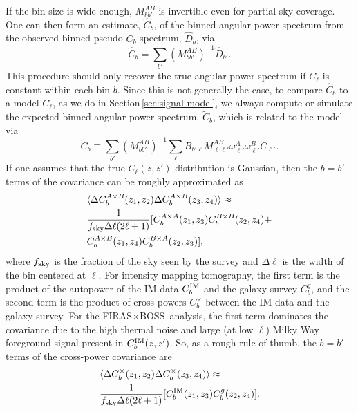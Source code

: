 \documentclass[fleqn,usenatbib]{mnras}
\newcommand{\FB}{FIRAS${\times}$BOSS}
\begin{document}
If the bin size is wide enough, $M^{AB}_{b b'}$ is invertible even for partial sky coverage. One can then form an estimate, $\hat{C}_b$, of the binned angular power spectrum from the observed binned pseudo-$C_{b}$ spectrum, $\hat{D}_b$, via
\begin{equation}\label{eq:binned_mixing}
\hat{C}_b = \sum_{b'} \left( M^{AB}_{b b'}\right)^{-1} \hat{D}_{b'}.
\end{equation}
This procedure should only recover the true angular power spectrum if $C_{\ell}$ is constant within each bin $b$. Since this is not generally the case, to compare $\hat{C}_{b}$ to a model $C_{\ell}$, as we do in Section\,\ref{sec:signal model}, we always compute or simulate the expected binned angular power spectrum, $\tilde{C}_b$, which is related to the model via
\begin{equation}\label{eq:model_mixing_binning}
\tilde{C}_b \equiv \sum_{b'} \left(M^{AB}_{b b'}\right)^{-1} \sum_{\ell} B_{b' \ell} M^{AB}_{\ell \ell'} \omega^A_{\ell'}\omega^B_{\ell'} C_{\ell'}.
\end{equation}
If one assumes that the true $C_{\ell}(z,z')$ distribution is Gaussian, then the $b = b'$ terms of the covariance can be roughly approximated as
\begin{equation}
\begin{split}\label{eq:general_gaussian_variance}
    &\langle \Delta C_b^{A\times B}(z_1,z_2) \Delta C_b^{A\times B}(z_3,z_4) \rangle \approx \\ &\frac{1}{f_{\rm sky} \Delta \ell (2\ell + 1)} [ C_b^{A\times A}(z_1,z_3) C_b^{B\times B}(z_2,z_4) + \\
    &C_b^{A\times B}(z_1,z_4) C_b^{B\times A}(z_2,z_3)],
\end{split}
\end{equation}
where $f_{\rm sky}$ is the fraction of the sky seen by the survey and $\Delta \ell$ is the width of the bin centered at $\ell$. For intensity mapping tomography, the first term is the product of the autopower of the IM data $C_b^{\rm IM}$ and the galaxy survey $C_b^{g}$, and the second term is the product of cross-powers $C_b^\times$ between the IM data and the galaxy survey. For the \FB\ analysis, the first term dominates the covariance due to the high thermal noise and large (at low $\ell$) Milky Way foreground signal present in $C_b^{\rm IM}(z,z')$. So, as a rough rule of thumb, the $b = b'$ terms of the cross-power covariance are
\begin{equation}\label{eq:cross_power_cov_approx}
\begin{split}
    &\langle \Delta C_b^{\times}(z_1,z_2) \Delta C_b^{\times}(z_3,z_4) \rangle \approx \\ &\frac{1}{f_{\rm sky} \Delta \ell (2\ell + 1)} [ C_b^{\rm IM}(z_1,z_3) C_b^{g}(z_2,z_4)].
\end{split}
\end{equation}
\end{document}
